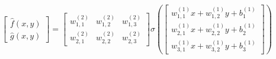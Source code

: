 \documentclass[preview]{standalone}
\begin{document}
\begin{align*}
\begin{bmatrix} \hat{f}(x,y) \\ \hat{g}(x,y) \end{bmatrix} = \begin{bmatrix} w_{1,1}^{(2)} & w_{1,2}^{(2)} & w_{1,3}^{(2)} \\ w_{2,1}^{(2)} & w_{2,2}^{(2)} & w_{2,3}^{(2)} \end{bmatrix} \sigma\left(\begin{bmatrix} w_{1,1}^{(1)}x + w_{1,2}^{(1)}y +b_1^{(1)} \\ w_{2,1}^{(1)}x + w_{2,2}^{(1)}y +b_2^{(1)} \\ w_{3,1}^{(1)}x + w_{3,2}^{(1)}y +b_3^{(1)} \end{bmatrix}\right)
\end{align*}
\end{document}

